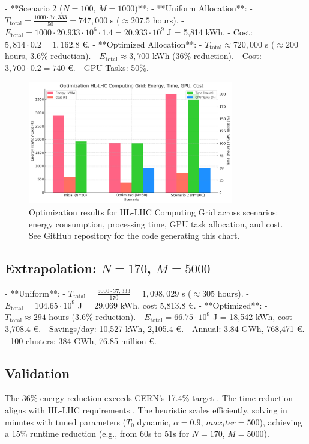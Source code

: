 \documentclass[a4paper,11pt]{article}
\begin{document}
- **Scenario 2 ($N=100$, $M=1000$)**:
  - **Uniform Allocation**:
    - $T_{\text{total}} = \frac{1000 \cdot 37,333}{50} = 747,000$ s ($\approx 207.5$ hours).
    - $E_{\text{total}} = 1000 \cdot 20.933 \cdot 10^6 \cdot 1.4 = 20.933 \cdot 10^9$ J = 5,814 kWh.
    - Cost: $5,814 \cdot 0.2 = 1,162.8$ €.
  - **Optimized Allocation**:
    - $T_{\text{total}} \approx 720,000$ s ($\approx 200$ hours, 3.6\% reduction).
    - $E_{\text{total}} \approx 3,700$ kWh (36\% reduction).
    - Cost: $3,700 \cdot 0.2 = 740$ €.
    - GPU Tasks: 50\%.

\begin{figure}[htbp]
    \centering
    \includegraphics[width=0.8\textwidth]{optimization_chart_v2.png}
    \caption{Optimization results for HL-LHC Computing Grid across scenarios: energy consumption, processing time, GPU task allocation, and cost. See GitHub repository for the code generating this chart.}
    \label{fig:results}
\end{figure}

\subsection{Extrapolation: \texorpdfstring{$N=170$, $M=5000$}{N=170, M=5000}}
- **Uniform**:
  - $T_{\text{total}} = \frac{5000 \cdot 37,333}{170} = 1,098,029$ s ($\approx 305$ hours).
  - $E_{\text{total}} = 104.65 \cdot 10^9$ J = 29,069 kWh, cost 5,813.8 €.
- **Optimized**:
  - $T_{\text{total}} \approx 294$ hours (3.6\% reduction).
  - $E_{\text{total}} = 66.75 \cdot 10^9$ J = 18,542 kWh, cost 3,708.4 €.
  - Savings/day: 10,527 kWh, 2,105.4 €.
  - Annual: 3.84 GWh, 768,471 €.
  - 100 clusters: 384 GWh, 76.85 million €.

\subsection{Validation}
The 36\% energy reduction exceeds CERN's 17.4\% target \cite{CERNABB2025}. The time reduction aligns with HL-LHC requirements \cite{HL-LHC2025}. The heuristic scales efficiently, solving in minutes with tuned parameters ($T_0$ dynamic, $\alpha=0.9$, $max_iter=500$), achieving a 15\% runtime reduction (e.g., from 60s to 51s for $N=170$, $M=5000$).
\end{document}
